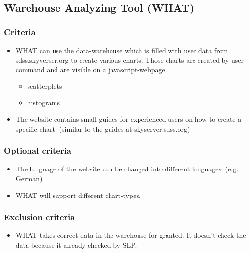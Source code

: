 \subsection{Warehouse Analyzing Tool (WHAT)}

\subsubsection{Criteria}
\begin{itemize}
\item WHAT can use the data-warehouse which is filled with user data  
from sdss.skyverser.org to create various charts. 
Those charts are created by user command and are visible on a javascript-webpage.
\begin{itemize}
\item scatterplots
\item histograms
\end{itemize}
\item The website contains small guides for experienced users on how to create a specific chart. 
(similar to the guides at skyserver.sdss.org)
\end{itemize}

\subsubsection{Optional criteria}
\begin{itemize}
\item The language of the website can be changed into different languages. (e.g. German)
\item WHAT will support different chart-types.
\end{itemize}

\subsubsection{Exclusion criteria}
\begin{itemize}
\item WHAT takes correct data in the warehouse for granted. It doesn't check the
 data because it already checked by SLP. 
\end{itemize}
